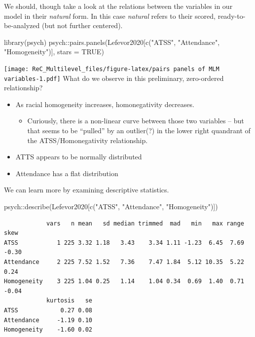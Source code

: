 \documentclass[
  11pt,
]{book}
\newenvironment{Shaded}{\begin{snugshade}}{\end{snugshade}}
\newcommand{\AttributeTok}[1]{\textcolor[rgb]{0.77,0.63,0.00}{#1}}
\newcommand{\ConstantTok}[1]{\textcolor[rgb]{0.00,0.00,0.00}{#1}}
\newcommand{\FunctionTok}[1]{\textcolor[rgb]{0.00,0.00,0.00}{#1}}
\newcommand{\NormalTok}[1]{#1}
\newcommand{\SpecialCharTok}[1]{\textcolor[rgb]{0.00,0.00,0.00}{#1}}
\newcommand{\StringTok}[1]{\textcolor[rgb]{0.31,0.60,0.02}{#1}}
\providecommand{\tightlist}{%
  \setlength{\itemsep}{0pt}\setlength{\parskip}{0pt}}
\begin{document}
We should, though take a look at the relations between the variables in our model in their \emph{natural} form. In this case \emph{natural} refers to their scored, ready-to-be-analyzed (but not further centered).

\begin{Shaded}
\begin{Highlighting}[]
\FunctionTok{library}\NormalTok{(psych)}
\NormalTok{psych}\SpecialCharTok{::}\FunctionTok{pairs.panels}\NormalTok{(Lefevor2020[}\FunctionTok{c}\NormalTok{(}\StringTok{"ATSS"}\NormalTok{, }\StringTok{"Attendance"}\NormalTok{, }\StringTok{"Homogeneity"}\NormalTok{)], }\AttributeTok{stars =} \ConstantTok{TRUE}\NormalTok{)}
\end{Highlighting}
\end{Shaded}

\texttt{[image: ReC\_Multilevel\_files/figure-latex/pairs panels of MLM variables-1.pdf]}
What do we observe in this preliminary, zero-ordered relationship?

\begin{itemize}
\tightlist
\item
  As racial homogeneity increases, homonegativity decreases.

  \begin{itemize}
  \tightlist
  \item
    Curiously, there is a non-linear curve between those two variables -- but that seems to be ``pulled'' by an outlier(?) in the lower right quandrant of the ATSS/Homonegativity relationship.
  \end{itemize}
\item
  ATTS appears to be normally distributed
\item
  Attendance has a flat distribution
\end{itemize}

We can learn more by examining descriptive statistics.

\begin{Shaded}
\begin{Highlighting}[]
\NormalTok{psych}\SpecialCharTok{::}\FunctionTok{describe}\NormalTok{(Lefevor2020[}\FunctionTok{c}\NormalTok{(}\StringTok{"ATSS"}\NormalTok{, }\StringTok{"Attendance"}\NormalTok{, }\StringTok{"Homogeneity"}\NormalTok{)])}
\end{Highlighting}
\end{Shaded}

\begin{verbatim}
            vars   n mean   sd median trimmed  mad   min   max range  skew
ATSS           1 225 3.32 1.18   3.43    3.34 1.11 -1.23  6.45  7.69 -0.30
Attendance     2 225 7.52 1.52   7.36    7.47 1.84  5.12 10.35  5.22  0.24
Homogeneity    3 225 1.04 0.25   1.14    1.04 0.34  0.69  1.40  0.71 -0.04
            kurtosis   se
ATSS            0.27 0.08
Attendance     -1.19 0.10
Homogeneity    -1.60 0.02
\end{verbatim}
\end{document}
